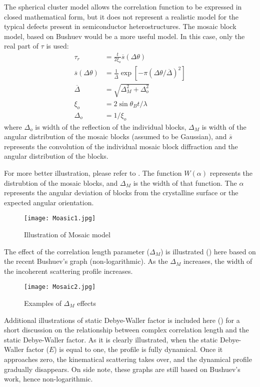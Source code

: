 The spherical cluster model allows the correlation function to be expressed in closed mathematical form, but it does not represent a realistic model for the typical defects present in semiconductor heterostructures.  The mosaic block model, based on Bushuev \cite{Bushuev2} would be a more useful model.  In this case, only the real part of $\tau$ is used:
\begin{align}
\tau_r &= \frac{t}{2 \xi_o} \overline{s}(\Delta \theta) \label{mosaic1} \\
\overline{s}(\Delta \theta) &= \frac{1}{\overline{\Delta}} \exp \left[ -\pi (\Delta \theta /\overline{\Delta})^2 \right] \label{mosaic2}\\
\overline{\Delta} &= \sqrt{\Delta_M^2 + \Delta_o^2}\label{mosaic3}\\
\xi_o &= 2 \sin \theta_B t /\lambda\label{mosaic4}\\
\Delta_o &= 1/\xi_o \label{mosaic5}
\end{align}
where $\Delta_o$ is width of the reflection of the individual blocks, $\Delta_M$ is width of the angular distribution of the mosaic blocks (assumed to be Gaussian), and $\overline{s}$ represents the convolution of the individual mosaic block diffraction and the angular distribution of the blocks. 

For more better illustration, please refer to .  The function $W(\alpha)$  represents the distrubtion of the mosaic blocks, and $\Delta_M$ is the width of that function.  The $\alpha$ represents the angular deviation of blocks from the crystalline surface or the expected angular orientation.  
\begin{figure}[h]
\centering
\caption{Illustration of Mosaic model}
\label{Mosaic1}
\texttt{[image: Moasic1.jpg]}
\end{figure}

The effect of the correlation length parameter ($\Delta_M$) is illustrated  () here based on the recent Bushuev's graph (non-logarithmic).  As the $\Delta_M$ increases, the width of the incoherent scattering profile increases.
\begin{figure}[h]
\centering
\caption{Examples of $\Delta_M$ effects}
\label{Mosaic2}
\texttt{[image: Mosaic2.jpg]}
\end{figure}

Additional illustrations of static Debye-Waller factor is included here () for a short discussion on the relationship between complex correlation length and the static Debye-Waller factor.  As it is clearly illustrated, when the static Debye-Waller factor ($E$) is equal to one, the profile is fully dynamical.  Once it approaches zero, the kinematical scattering takes over, and the dynamical profile gradually disappears.  On side note, these graphs are still based on Bushuev's work, hence non-logarithmic.  

